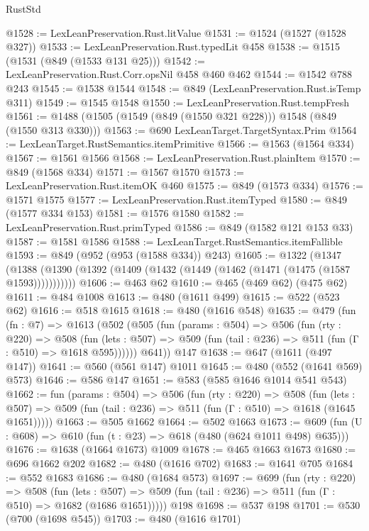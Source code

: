\begin{lexlean}{RustStd}
\begin{coremodule}
@1528 := LexLeanPreservation.Rust.litValue
@1531 := @1524 (@1527 (@1528 @327))
@1533 := LexLeanPreservation.Rust.typedLit @458
@1538 := @1515 (@1531 (@849 (@1533 @131 @25)))
@1542 := LexLeanPreservation.Rust.Corr.opsNil @458 @460 @462
@1544 := @1542 @788 @243
@1545 := @1538 @1544
@1548 := @849 (LexLeanPreservation.Rust.isTemp @311)
@1549 := @1545 @1548
@1550 := LexLeanPreservation.Rust.tempFresh
@1561 := @1488 (@1505 (@1549 (@849 (@1550 @321 @228))) @1548 (@849 (@1550 @313 @330)))
@1563 := @690 LexLeanTarget.TargetSyntax.Prim
@1564 := LexLeanTarget.RustSemantics.itemPrimitive
@1566 := @1563 (@1564 @334)
@1567 := @1561 @1566
@1568 := LexLeanPreservation.Rust.plainItem
@1570 := @849 (@1568 @334)
@1571 := @1567 @1570
@1573 := LexLeanPreservation.Rust.itemOK @460
@1575 := @849 (@1573 @334)
@1576 := @1571 @1575
@1577 := LexLeanPreservation.Rust.itemTyped
@1580 := @849 (@1577 @334 @153)
@1581 := @1576 @1580
@1582 := LexLeanPreservation.Rust.primTyped
@1586 := @849 (@1582 @121 @153 @33)
@1587 := @1581 @1586
@1588 := LexLeanTarget.RustSemantics.itemFallible
@1593 := @849 (@952 (@953 (@1588 @334)) @243)
@1605 := @1322
    (@1347 (@1388 (@1390 (@1392 (@1409 (@1432 (@1449 (@1462 (@1471 (@1475 (@1587 @1593)))))))))))
@1606 := @463 @62
@1610 := @465 (@469 @62) (@475 @62)
@1611 := @484 @1008
@1613 := @480 (@1611 @499)
@1615 := @522 (@523 @62)
@1616 := @518 @1615
@1618 := @480 (@1616 @548)
@1635 := @479
    (fun (fn : @7) =>
    @1613
      (@502
        (@505
          (fun (params : @504) =>
          @506
            (fun (rty : @220) =>
            @508
              (fun (lets : @507) =>
              @509 (fun (tail : @236) => @511 (fun (Γ : @510) => @1618 @595))))))
        @641))
    @147
@1638 := @647 (@1611 (@497 @147))
@1641 := @560 (@561 @147) @1011
@1645 := @480 (@552 (@1641 @569) @573)
@1646 := @586 @147
@1651 := @583 (@585 @1646 @1014 @541 @543)
@1662 := fun (params : @504) =>
  @506
    (fun (rty : @220) =>
    @508
      (fun (lets : @507) =>
      @509 (fun (tail : @236) => @511 (fun (Γ : @510) => @1618 (@1645 @1651)))))
@1663 := @505 @1662
@1664 := @502 @1663
@1673 := @609 (fun (U : @608) => @610 (fun (t : @23) => @618 (@480 (@624 @1011 @498) @635)))
@1676 := @1638 (@1664 @1673) @1009
@1678 := @465 @1663 @1673
@1680 := @696 @1662 @202
@1682 := @480 (@1616 @702)
@1683 := @1641 @705
@1684 := @552 @1683
@1686 := @480 (@1684 @573)
@1697 := @699
    (fun (rty : @220) =>
    @508
      (fun (lets : @507) =>
      @509 (fun (tail : @236) => @511 (fun (Γ : @510) => @1682 (@1686 @1651)))))
    @198
@1698 := @537 @198
@1701 := @530 (@700 (@1698 @545))
@1703 := @480 (@1616 @1701)

\end{coremodule}
\end{lexlean}
